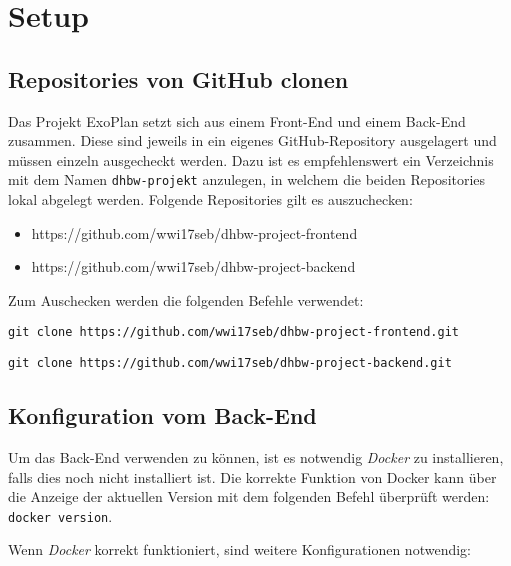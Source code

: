 \section{Setup}
\subsection{Repositories von GitHub clonen}

Das Projekt ExoPlan setzt sich aus einem Front-End und einem Back-End zusammen. 
Diese sind jeweils in ein eigenes GitHub-Repository ausgelagert und müssen einzeln ausgecheckt werden. 
Dazu ist es empfehlenswert ein Verzeichnis mit dem Namen \texttt{dhbw-projekt} anzulegen, in welchem die beiden Repositories lokal abgelegt werden. 
Folgende Repositories gilt es auszuchecken:
\begin{itemize}
	\item https://github.com/wwi17seb/dhbw-project-frontend
	\item https://github.com/wwi17seb/dhbw-project-backend
\end{itemize}

Zum Auschecken werden die folgenden Befehle verwendet:

\texttt{git clone https://github.com/wwi17seb/dhbw-project-frontend.git}

\texttt{git clone https://github.com/wwi17seb/dhbw-project-backend.git}

\subsection{Konfiguration vom Back-End}

Um das Back-End verwenden zu können, ist es notwendig \textit{Docker} zu installieren, falls dies noch nicht installiert ist. 
Die korrekte Funktion von Docker kann über die Anzeige der aktuellen Version mit dem folgenden Befehl überprüft werden: \texttt{docker version}.

Wenn \textit{Docker} korrekt funktioniert, sind weitere Konfigurationen notwendig:

